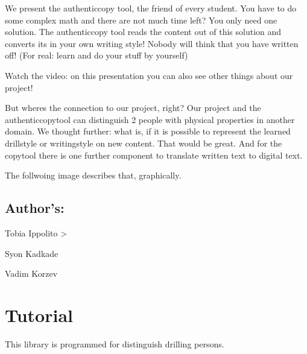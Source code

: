 \documentclass[letterpaper,10pt,english]{sphinxmanual}
\let\sphinxpxdimen\pdfpxdimen\else\newdimen\sphinxpxdimen
\begin{document}
\sphinxAtStartPar
We present the authentic\sphinxhyphen{}copy tool, the friend of every student. You have to do some complex math and there are not much time left?
You only need one solution. The authentic\sphinxhyphen{}copy tool reads the content out of this solution and converts its in your own writing style!
Nobody will think that you have written off! (For real: learn and do your stuff by yourself)

\sphinxAtStartPar
Watch the video:  on this presentation you can also see other things about our project!

\sphinxAtStartPar
But wheres the connection to our project, right? Our project and the authentic\sphinxhyphen{}copy\sphinxhyphen{}tool can distinguish 2 people with physical properties in another domain.
We thought further: what is, if it is possible to represent the learned drill\sphinxhyphen{}style or writing\sphinxhyphen{}style on new content.
That would be great.
And for the copy\sphinxhyphen{}tool there is one further component to translate written text to digital text.

\sphinxAtStartPar
The follwoing image describes that, graphically.

\noindent\sphinxincludegraphics[width=600\sphinxpxdimen]{{Future-Copy-Tool}.jpeg}


\section{Author’s:}
\label{\detokenize{introduction:author-s}}
\sphinxAtStartPar
Tobia Ippolito \sphinxhyphen{}\textgreater{} 

\sphinxAtStartPar
Syon Kadkade

\sphinxAtStartPar
Vadim Korzev


\chapter{Tutorial}
\label{\detokenize{tutorial:tutorial}}\label{\detokenize{tutorial::doc}}
\sphinxAtStartPar
This library is programmed for distinguish drilling persons.
\end{document}
